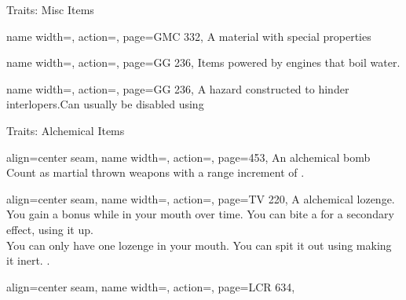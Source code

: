 \begin{PageFront}
\begin{Tables}{\frontTableHeight}
\begin{Table}{Traits: Misc Items}
            \begin{entry}{}{%
                name width=\conditionLength,%
                action=\Precious,
                page=GMC 332,
            }
                A material with special properties
            \end{entry}
            \begin{entry}{}{%
                name width=\conditionLength,%
                action=\Steam,
                page=GG 236,
            }
                Items powered by engines that boil water.
            \end{entry}
            \begin{entry}{}{%
                name width=\conditionLength,%
                action=\Trap,
                page=GG 236,
            }
                A hazard constructed to hinder interlopers.\hfill Can usually
                be disabled using 
            \end{entry}
        \end{Table}\TableSpace
        \begin{Table}{Traits: Alchemical Items}
            \begin{entry}{}{%
                align=center seam,
                name width=\conditionLength,%
                action=\Bomb,
                page=453,
            }
                An alchemical bomb \hfill {} \\ Count as martial thrown weapons with a range increment of  \Feet.
                \hfill {}
            \end{entry}
            \begin{entry}{}{%
                align=center seam,
                name width=\conditionLength,%
                action=\Lozenge,
                page=TV 220,
            }
                A alchemical lozenge. You gain a bonus while in your mouth over time. \hfill You can bite a for
                a secondary effect, using it up.\\
                You can only have one lozenge in your mouth. You can spit it out using  making it inert.
                \hfill{}.
            \end{entry}
            \begin{entry}{}{%
                align=center seam,
                name width=\conditionLength,%
                action=\Mutagen,
                page=LCR 634,
            }

\end{entry}
\end{Table}
\end{Tables}
\end{PageFront}
